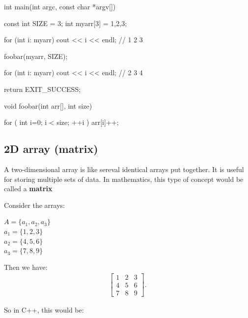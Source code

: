 \documentclass{report}
\begin{document}
    \begin{cppcode}
int main(int argc, const char *argv[]) {

    const int SIZE = 3;
    int myarr[3] = {1,2,3};

    for (int i: myarr) cout << i << endl; // 1 2 3

    foobar(myarr, SIZE);

    for (int i: myarr) cout << i << endl; // 2 3 4



    return EXIT_SUCCESS;
}

void foobar(int arr[], int size) {

    for ( int i=0; i < size; ++i ) {
        arr[i]++;
    }


}
    \end{cppcode}
    

    \bigbreak \noindent 

    \pagebreak
    \subsection{2D array (matrix)}
    \bigbreak \noindent 
    \begin{concept}
 A two-dimensional array is like sereval identical arrays put together. It is useful for storing multiple sets of data. In mathematics, this type of concept would be called a \textbf{matrix}
	\end{concept}
    \bigbreak \noindent 
    \begin{minipage}[]{0.47\textwidth}
    Consider the arrays:
    \begin{center}
        $A = \{a_{1}, a_{2}, a_{3}\} $ \\
        $a_{1} = \{1,2,3\} $ \\
        $a_{2} = \{4,5,6\} $ \\
        $a_{3} = \{7,8,9\} $ \\
    \end{center}
    \end{minipage}
    \begin{minipage}[]{0.47\textwidth}
    Then we have:
    \begin{align*}
        \begin{bmatrix}
            1 & 2 & 3 \\
            4 & 5 & 6 \\
            7 & 8 & 9
        \end{bmatrix}
    .\end{align*}
    \end{minipage}
    \bigbreak \noindent 
    So in C++, this would be:
    \bigbreak \noindent 
    
\end{document}
